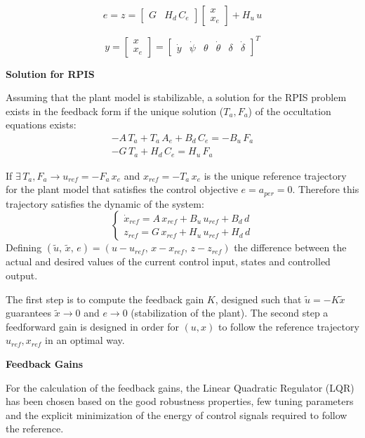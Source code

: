 \[e=z=\begin{bmatrix}G & H_{d}\,C_{e}\end{bmatrix}\begin{bmatrix}x \\ x_{e}\end{bmatrix} + H_{u}\,u\]

\[y=\begin{bmatrix}x \\ x_{e}\end{bmatrix}=\begin{bmatrix}
\dot{y} & \dot{\psi} & \theta & \dot{\theta} & \delta & \dot{\delta}\end{bmatrix}^{T}\]

\textbf{Solution for RPIS}

Assuming that the plant model is stabilizable, a solution for the RPIS problem exists in the feedback form if the unique solution ($T_{a},F_{a}$) of the occultation equations exists:
\begin{eqnarray}
-A\,T_{a}+T_{a}\,A_{e}+B_{d}\,C_{e}=-B_{u}\,F_{a} \\
-G\,T_{a}+H_{d}\,C_{e}=H_{u}\,F_{a}
\end{eqnarray}

If $\exists\, T_{a}, F_{a} \rightarrow u_{ref}=-F_{a}\,x_{e}$ and $x_{ref}=-T_{a}\,x_{e}$ is the unique reference trajectory for the plant model that satisfies the control objective $e=a_{per}=0$. Therefore this trajectory satisfies the dynamic of the system:
\begin{equation}
\begin{cases}\dot{x}_{ref}=A\,x_{ref}+B_{u}\,u_{ref}+B_{d}\,d\\ z_{ref}=G\,x_{ref}+H_{u}\,u_{ref}+H_{d}\,d\end{cases}
\label{sylvester}
\end{equation}
Defining $(\tilde{u},\,\tilde{x},\,e)=(u-u_{ref},\,x-x_{ref},\,z-z_{ref})$ the difference between the actual and desired values of the current control input, states and controlled output.

The first step is to compute the feedback gain $K$, designed such that $\tilde{u}=-K\tilde{x}$ guarantees $\tilde{x}\rightarrow 0$ and $e\rightarrow 0$ (stabilization of the plant). The second step a feedforward gain is designed in order for $(u,x)$ to follow the reference trajectory $u_{ref},x_{ref}$ in an optimal way.

\textbf{Feedback Gains}

For the calculation of the feedback gains, the Linear Quadratic Regulator (LQR)\cite{lec5}\cite{rob3}\cite{Wonham:1614618} has been chosen based on the good robustness properties, few tuning parameters and the explicit minimization of the energy of control signals required to follow the reference.

